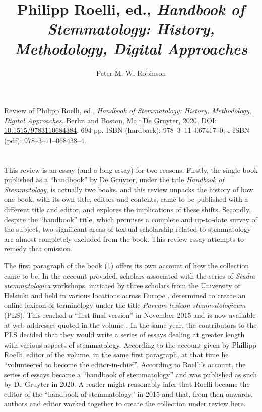 \documentclass{article}
\author{Peter M. W. Robinson}
\title{Philipp Roelli, ed., \emph{Handbook of Stemmatology: History, Methodology, Digital Approaches}}
\begin{document}
\maketitle

\begin{reviewed}
Review of Philipp Roelli, ed., \emph{Handbook of Stemmatology: History, Methodology, Digital Approaches}. Berlin and Boston, Ma.: De
Gruyter, 2020, DOI: \href{https://doi.org/10.1515/9783110684384}{10.1515/9783110684384}. 694
pp. ISBN (hardback): 978--3--11--067417--0; e-ISBN (pdf):
978--3--11--068438--4.
\end{reviewed}



\section*{} 
This review is an essay (and a long essay) for two reasons.
Firstly, the single book published as a ``handbook'' by De Gruyter,
under the title \emph{Handbook of Stemmatology}, is actually two books,
and this review unpacks the history of how one book, with its own title,
editors and contents, came to be published with a different title and
editor, and explores the implications of these shifts. Secondly, despite
the ``handbook'' title, which promises a complete and up-to-date survey
of the subject, two significant areas of textual scholarship related to
stemmatology are almost completely excluded from the book. This review
essay attempts to remedy that omission.

The first paragraph of the book (1) offers its own account of
how the collection came to be. In the account provided, scholars
associated with the series of \emph{Studia stemmatologica} workshops,
initiated by three scholars from the University of Helsinki and held in
various locations across Europe \parencite{heikkila_studia_2010}, determined to
create an online lexicon of terminology under the title \emph{Parvum
lexicon stemmatologicum} (PLS). This reached a ``first final version''
in November 2015 and is now available at web addresses quoted in the
volume \parencite{roelli_parvum_2015}. In the same year, the contributors to the
PLS decided that they would write a series of essays dealing at greater
length with various aspects of stemmatology. According to the account
given by Phillipp Roelli, editor of the volume, in the same first
paragraph, at that time he ``volunteered to become the
editor-in-chief''. According to Roelli's account, the series of essays
became a ``handbook of stemmatology'' and was published as such by De
Gruyter in 2020. A reader might reasonably infer that Roelli became the
editor of the ``handbook of stemmatology'' in 2015 and that, from then
onwards, authors and editor worked together to create the collection
under review here.
\end{document}
